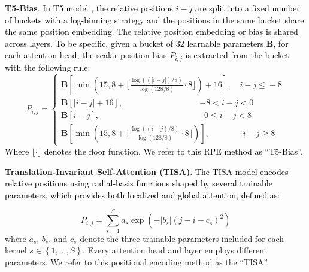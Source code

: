 \documentclass[journal]{IEEEtran}
\begin{document}
\textbf{T5-Bias}. 
\textcolor{black}{In T5 model \cite{T5}, the relative positions $i-j$ are split into a fixed number of buckets with a log-binning strategy and the positions in the same bucket share the same position embedding. The relative position embedding or bias is shared across layers. To be specific, given a bucket of $32$ learnable parameters $\textbf{B}$, for each attention head, the scalar position bias $P_{i,j}$ is extracted from the bucket with the following rule: }
\begin{equation}
P_{i,j}\!=\! 
\begin{cases}
\textbf{B}[\min(15,8\!+\!\lfloor\frac{\log ((|i-j|)/8)}{\log(128/8)} \cdot 8\rfloor)\!+\!16], \quad i\!-\!j \!\leq\! -8 \\
\textbf{B}[|i-j|+16], \qquad \qquad \qquad \qquad \quad \, \!{-8}\!<\! i\!-\!j\!<\!0\\ 
\textbf{B}[i-j], \qquad \qquad \qquad \qquad \qquad \qquad \,\,\, 0\!\leq\!i\!-\!j\!<\!8\\ 
\textbf{B}[\min(15,8\!+\!\lfloor\frac{\log ((i-j) / 8)}{\log (128 / 8)} \cdot 8\rfloor)], \qquad \qquad i\!-\!j\!\geq\! 8
\end{cases}
\end{equation}
\textcolor{black}{Where $\lfloor\cdot\rfloor$ denotes the floor function. We refer to this RPE method as ``T5-Bias''.}

\textbf{Translation-Invariant Self-Attention (TISA)}. \textcolor{black}{The TISA model \cite{tisa} encodes relative positions using radial-basis functions shaped by several trainable parameters, which provides both localized and global attention, defined as:}

\begin{equation}
{P_{i,j}=\sum_{s=1}^S a_s \exp \left(-\left|b_s\right|\left(j-i-c_s\right)^2\right)}
\end{equation}
{where $a_s$, $b_s$, and $c_s$ denote the three trainable parameters included for each kernel $s\!\in\!\left\{1,...,S\right\}$.} Every attention head and layer employs different parameters. We refer to this positional encoding method as the ``TISA''. %
\end{document}
